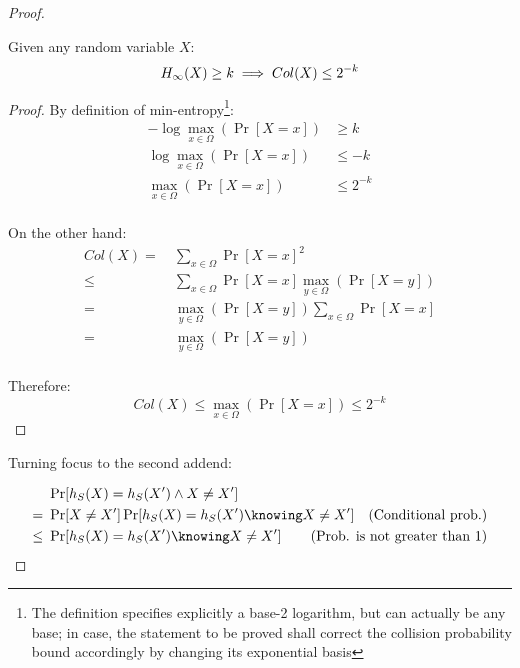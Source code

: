 \begin{proof}
    \begin{proposition}
        Given any random variable $X$:
        \[
            H_\infty(X) \geq k \implies Col(X) \leq 2^{-k} \qedhere
        \]
    \end{proposition}

    \begin{proof}
        By definition of min-entropy\footnote{The definition specifies explicitly a base-2 logarithm, but can actually be any base; in case, the statement to be proved shall correct the collision probability bound accordingly by changing its exponential basis}:
        \begin{align*}
            -\log \max_{x \in \Omega}(\Pr [X = x]) &\geq k      \\
            \log \max_{x \in \Omega}(\Pr [X = x])  &\leq -k     \\
            \max_{x \in \Omega}(\Pr [X = x])       &\leq 2^{-k} \\
        \end{align*}

        On the other hand:
        \begin{align*}
            Col(X) =&\ \sum_{x \in \Omega} \Pr[X = x]^2                               \\
                \leq&\ \sum_{x \in \Omega} \Pr[X = x] \max_{y \in \Omega}(\Pr[X = y]) \\
                   =&\ \max_{y \in \Omega}(\Pr[X = y]) \sum_{x \in \Omega} \Pr[X = x] \\
                   =&\ \max_{y \in \Omega}(\Pr[X = y])                                \\
        \end{align*}

        Therefore:
        \[
            Col(X) \leq \max_{x \in \Omega}(\Pr[X = x]) \leq 2^{-k}
        \]
    \end{proof}

    Turning focus to the second addend:

    \begin{align*}
            &\ \Pr[h_S(X) = h_S(X') \wedge X \neq X']                  &                                                  \\
           =&\ \Pr[X \neq X'] \Pr[h_S(X) = h_S(X') \knowing X \neq X'] & \text{(Conditional prob.)}                       \\
        \leq&\ \Pr[h_S(X) = h_S(X') \knowing X \neq X']                & \mathllap{\text{(Prob. is not greater than 1)}}  \\
    \end{align*}


\end{proof}
